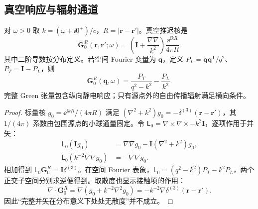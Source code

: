 \subsection{真空响应与辐射通道}
\label{sec:feqo-vacuum-dyadic}
\begin{proposition}[真空并矢与纵横分解]
对 $\omega>0$ 取 $k=(\omega+\ii0^+)/c$，$R=|\mathbf r-\mathbf r'|$。真空推迟核是
\begin{equation}
 \mathbf G_0^R(\mathbf r,\mathbf r';\omega)
 =\left(\mathbf I+\frac{\nabla\nabla}{k^2}\right)
 \frac{\ee^{\ii kR}}{4\pi R}.
 \label{eq:feqo-vacuum-green}
\end{equation}
其中二阶导数按分布定义。若空间 Fourier 变量为 $\mathbf q$，定义 $P_L=\mathbf q\mathbf q^{\mathsf T}/q^2$、$P_T=\mathbf I-P_L$，则
\begin{equation}
 \mathbf G_0^R(\mathbf q,\omega)
 =\frac{P_T}{q^2-k^2}-\frac{P_L}{k^2}.
 \label{eq:feqo-vacuum-transverse-longitudinal}
\end{equation}
完整 Green 张量包含纵向静电响应；只有源点外的自由传播辐射满足横向条件。
\end{proposition}

\begin{proof}
标量核 $g_0=\ee^{\ii kR}/(4\pi R)$ 满足 $(\nabla^2+k^2)g_0=-\delta^{(3)}(\mathbf r-\mathbf r')$，其 $1/(4\pi)$ 系数由包围源点的小球通量固定。令 $\mathsf L_0=\nabla\times\nabla\times-k^2\mathbf I$，逐项作用于并矢：
\begin{align*}
 \mathsf L_0(\mathbf I g_0)&=\nabla\nabla g_0-\mathbf I(\nabla^2+k^2)g_0,\\
 \mathsf L_0(k^{-2}\nabla\nabla g_0)&=-\nabla\nabla g_0.
\end{align*}
相加得到 $\mathsf L_0\mathbf G_0^R=\mathbf I\delta^{(3)}$。在空间 Fourier 表象，$\mathsf L_0=(q^2-k^2)P_T-k^2P_L$，两个正交子空间分别求逆便得到。取散度也显示接触项的作用：
\begin{equation*}
 \nabla\cdot\mathbf G_0^R
 =\nabla(g_0+k^{-2}\nabla^2g_0)
 =-k^{-2}\nabla\delta^{(3)}(\mathbf r-\mathbf r').
\end{equation*}
因此“完整并矢在分布意义下处处无散度”并不成立。
\end{proof}

